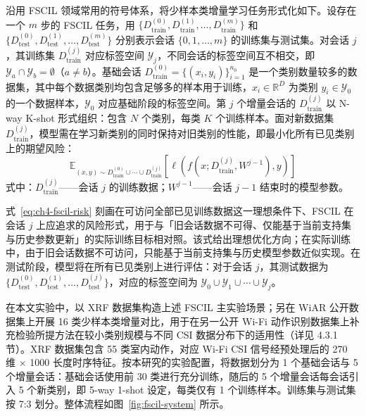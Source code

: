 沿用 FSCIL 领域常用的符号体系\cite{tian2024fscilsurvey}，将少样本类增量学习任务形式化如下。设存在一个 $m$ 步的 FSCIL 任务，用 $\{D_{\mathrm{train}}^{(0)}, D_{\mathrm{train}}^{(1)}, \ldots, D_{\mathrm{train}}^{(m)}\}$ 和 $\{D_{\mathrm{test}}^{(0)}, D_{\mathrm{test}}^{(1)}, \ldots, D_{\mathrm{test}}^{(m)}\}$ 分别表示会话 $\{0, 1, \ldots, m\}$ 的训练集与测试集。对会话 $j$，其训练集 $D_{\mathrm{train}}^{(j)}$ 对应标签空间 $\mathcal{Y}_j$，不同会话的标签空间互不相交，即 $\mathcal{Y}_a \cap \mathcal{Y}_b = \emptyset$（$a \neq b$）。基础会话 $D_{\mathrm{train}}^{(0)} = \{(x_i, y_i)\}_{i=1}^{n_0}$ 是一个类别数量较多的数据集，其中每个数据类别均包含足够多的样本用于训练，$x_i \in \mathbb{R}^D$ 为类别 $y_i \in \mathcal{Y}_0$ 的一个数据样本，$\mathcal{Y}_0$ 对应基础阶段的标签空间。第 $j$ 个增量会话的 $D_{\mathrm{train}}^{(j)}$ 以 N-way K-shot 形式组织：包含 $N$ 个类别，每类 $K$ 个训练样本。面对新数据集 $D_{\mathrm{train}}^{(j)}$，模型需在学习新类别的同时保持对旧类别的性能，即最小化所有已见类别上的期望风险：
\begin{equation}\label{eq:ch4-fscil-risk}
  \mathbb{E}_{(x,y) \sim D_{\mathrm{train}}^{(0)} \cup \cdots \cup D_{\mathrm{train}}^{(j)}} \left[ \ell\left( f\left(x; D_{\mathrm{train}}^{(j)}, W^{j-1}\right), y \right) \right]
\end{equation}
\noindent 式中：$D_{\mathrm{train}}^{(j)}$——会话 $j$ 的训练数据；$W^{j-1}$——会话 $j-1$ 结束时的模型参数。

式~\eqref{eq:ch4-fscil-risk} 刻画在可访问全部已见训练数据这一理想条件下、FSCIL 在会话 $j$ 上应追求的风险形式，用于与「旧会话数据不可得、仅能基于当前支持集与历史参数更新」的实际训练目标相对照。该式给出理想优化方向；在实际训练中，由于旧会话数据不可访问，只能基于当前支持集与历史模型参数近似实现。在测试阶段，模型将在所有已见类别上进行评估：对于会话 $j$，其测试数据为 $\{D_{\mathrm{test}}^{(0)}, D_{\mathrm{test}}^{(1)}, \ldots, D_{\mathrm{test}}^{(j)}\}$，对应的标签空间为 $\mathcal{Y}_0 \cup \mathcal{Y}_1 \cup \cdots \cup \mathcal{Y}_j$。

在本文实验中，以 XRF 数据集构造上述 FSCIL 主实验场景；另在 WiAR 公开数据集上开展 16 类少样本类增量对比，用于在另一公开 Wi-Fi 动作识别数据集上补充检验所提方法在较小类别规模与不同 CSI 数据分布下的适用性（详见 4.3.1 节）。XRF 数据集包含 55 类室内动作，对应 Wi-Fi CSI 信号经预处理后的 270 维 × 1000 长度时序特征。按本研究的实验配置，将数据划分为 1 个基础会话与 5 个增量会话：基础会话使用前 30 类进行充分训练，随后的 5 个增量会话每会话引入 5 个新类别，即 5-way 1-shot 设定，每类仅有 1 个训练样本。训练集与测试集按 7:3 划分。整体流程如图~\ref{fig:fscil-system} 所示。

